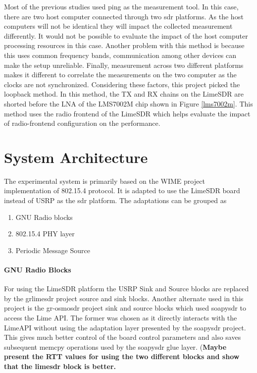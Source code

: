 Most of the previous studies used ping as the measurement tool.
In this case, there are two host computer connected through two \ac{sdr} platforms.
As the host computers will not be identical they will impact the collected measurement differently.
It would not be possible to evaluate the impact of the host computer processing resources in this case.
Another problem with this method is because this uses common frequency bands, communication among other devices can make the setup unreliable.
Finally, measurement across two different platforms makes it different to correlate the measurements on the two computer as the clocks are not synchronized.
Considering these factors, this project picked the loopback method.
In this method, the TX and RX chains on the LimeSDR are shorted before the \ac{LNA} of the LMS7002M chip shown in Figure \ref{lms7002m}.
This method uses the radio frontend of the LimeSDR which helps evaluate the impact of radio-frontend configuration on the performance.




\section{System Architecture}
The experimental system is primarily based on the WIME project implementation of 802.15.4 protocol. It is adapted to use the LimeSDR board instead of USRP as the \ac{sdr} platform. The adaptations can be grouped as

\begin{enumerate}
\item{GNU Radio blocks}
\item{802.15.4 \ac{PHY} layer}
\item{Periodic Message Source}
\end{enumerate}

\paragraph{GNU Radio Blocks}

For using the LimeSDR platform the USRP Sink and Source blocks are replaced by the grlimesdr project source and sink blocks. Another alternate used in this project is the gr-osmosdr project sink and source blocks which used soapysdr to access the Lime API. The former was chosen as it directly interacts with the LimeAPI without using the adaptation layer presented by the soapysdr project. This gives much better control of the board control parameters and also saves subsequent memcpy operations used by the soapysdr glue layer. (\textbf{Maybe present the RTT values for using the two different blocks and show that the limesdr block is better.}

